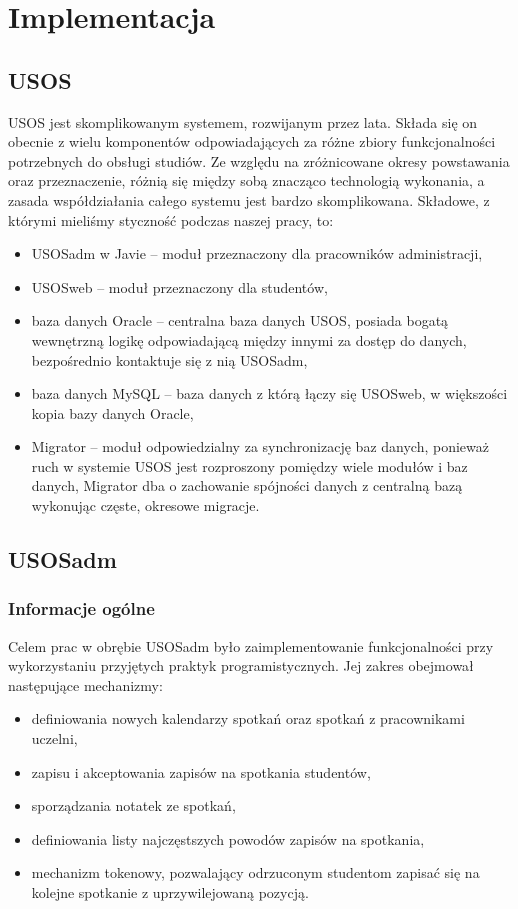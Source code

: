 \documentclass[licencjacka]{pracamgr}
\begin{document}
\chapter{Implementacja} \label{chap:implementacja}
\section{USOS}
USOS jest skomplikowanym systemem, rozwijanym przez lata. Składa się on obecnie z wielu komponentów odpowiadających za różne zbiory funkcjonalności potrzebnych do obsługi studiów. Ze względu na zróżnicowane okresy powstawania oraz przeznaczenie, różnią się między sobą znacząco technologią wykonania, a zasada współdziałania całego systemu jest bardzo skomplikowana.
Składowe, z którymi mieliśmy styczność podczas naszej pracy, to:
\begin{itemize}
\item USOSadm w Javie -- moduł przeznaczony dla pracowników administracji,
\item USOSweb -- moduł przeznaczony dla studentów,
\item baza danych Oracle -- centralna baza danych USOS, posiada bogatą wewnętrzną logikę odpowiadającą między innymi za dostęp do danych, bezpośrednio kontaktuje się z nią USOSadm,
\item baza danych MySQL -- baza danych z którą łączy się USOSweb, w większości kopia bazy danych Oracle,
\item Migrator -- moduł odpowiedzialny za synchronizację baz danych, ponieważ ruch w systemie USOS jest rozproszony pomiędzy wiele modułów i baz danych, Migrator dba o zachowanie spójności danych z centralną bazą wykonując częste, okresowe migracje.
\end{itemize}

\section{USOSadm} \label{sec:impusos}

\subsection{Informacje ogólne}
Celem prac w obrębie USOSadm było zaimplementowanie funkcjonalności przy wykorzystaniu przyjętych praktyk programistycznych. Jej zakres obejmował następujące mechanizmy:
\begin{itemize}
\item definiowania nowych kalendarzy spotkań oraz spotkań z pracownikami uczelni,
\item zapisu i akceptowania zapisów na spotkania studentów,
\item sporządzania notatek ze spotkań,
\item definiowania listy najczęstszych powodów zapisów na spotkania,
\item mechanizm tokenowy, pozwalający odrzuconym studentom zapisać się na kolejne spotkanie z uprzywilejowaną pozycją.
\end{itemize}
\end{document}
